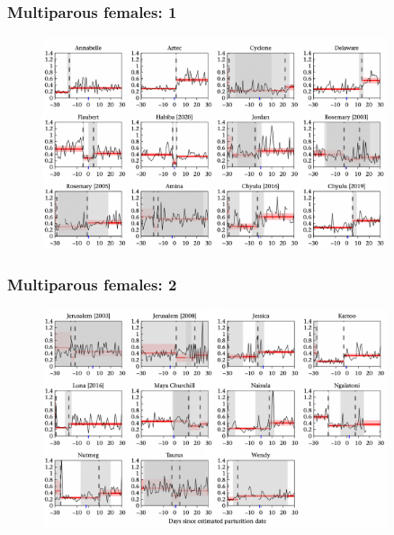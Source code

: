 \documentclass{beamer}
\begin{document}
\begin{frame}
\frametitle{Multiparous females: 1}

\begin{figure}
    \centering
    \includegraphics[width=0.9\textwidth]{figures/multiparous_1.png}
\end{figure}
    
\end{frame}

\begin{frame}
\frametitle{Multiparous females: 2}

\begin{figure}
    \centering
    \includegraphics[width=0.9\textwidth]{figures/multiparous_2.png}
\end{figure}
    
\end{frame}
\end{document}
